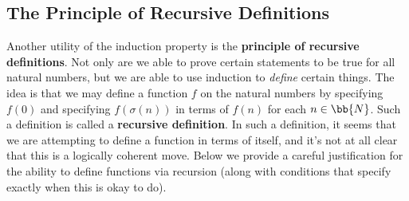 \subsection{The Principle of Recursive Definitions}

Another utility of the induction property is the \textbf{principle of recursive definitions}.
Not only are we able to prove certain statements to be true for all natural numbers, but we are able to use induction to \emph{define} certain things.
The idea is that we may define a function $f$ on the natural numbers by specifying $f(0)$ and specifying $f(\sigma(n))$ in terms of $f(n)$ for each $n\in\bb{N}$.
Such a definition is called a \textbf{recursive definition}.
In such a definition, it seems that we are attempting to define a function in terms of itself, and it's not at all clear that this is a logically coherent move.
Below we provide a careful justification for the ability to define functions via recursion (along with conditions that specify exactly when this is okay to do). 


